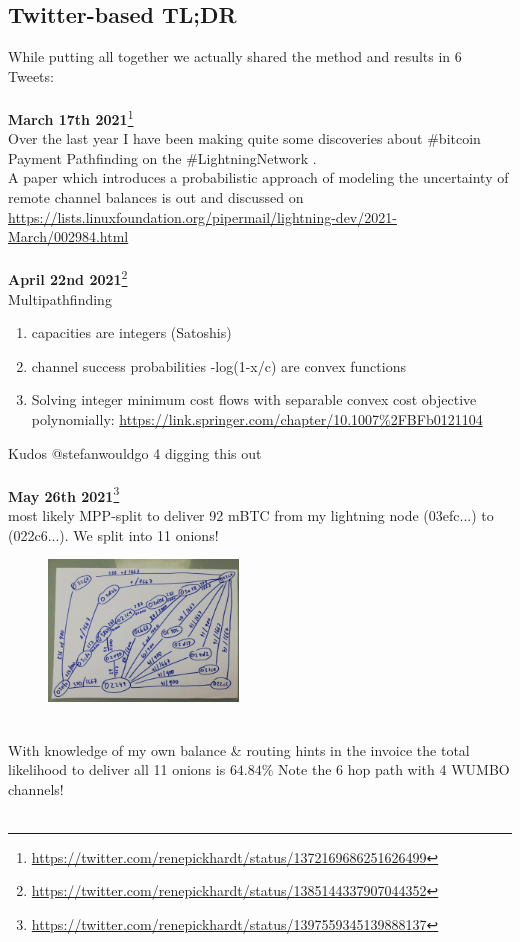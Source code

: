 \documentclass[10pt,twocolumn]{article}
\begin{document}
\begin{appendix}
  \section{Twitter-based TL;DR}
  While putting all together we actually shared the method and results in 6 Tweets:
  \\\\

    \textbf{March 17th 2021}\footnote{\url{https://twitter.com/renepickhardt/status/1372169686251626499}} \\
    Over the last year I have been making quite some discoveries about  \#bitcoin Payment Pathfinding on the \#LightningNetwork .\\A paper which introduces a probabilistic approach of modeling the uncertainty of remote channel balances is out and discussed on \url{https://lists.linuxfoundation.org/pipermail/lightning-dev/2021-March/002984.html}\\\\
  
  \textbf{April 22nd 2021}\footnote{\url{https://twitter.com/renepickhardt/status/1385144337907044352}} \\
  Multipathfinding 
\begin{enumerate}
\item capacities are integers (Satoshis)
\item channel success probabilities -log(1-x/c) are convex functions
\item Solving integer minimum cost flows with separable convex cost objective polynomially: \url{https://link.springer.com/chapter/10.1007\%2FBFb0121104}
\end{enumerate}
  Kudos @stefanwouldgo 4 digging this out
\\\\
  
  \textbf{May 26th 2021}\footnote{\url{https://twitter.com/renepickhardt/status/1397559345139888137}}\\
  most likely MPP-split to deliver 92 mBTC from my lightning node (03efc...) to (022c6...).
  We split into 11 onions!
\begin{figure}[htpb]
  \center
  \includegraphics[width=0.45\textwidth]{img/optflow.jpeg}
  \label{fig:optflow}
\end{figure}\\
With knowledge of my own balance \& routing hints in the invoice the total likelihood to deliver all 11 onions is $64.84\%$
Note the 6 hop path with 4 WUMBO channels!
\\\\


\end{appendix}
\end{document}
